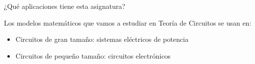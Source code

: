 \documentclass[aspectratio=169, xcolor={usenames,svgnames,dvipsnames}]{beamer}
\begin{document}

\begin{frame}{¿Qué aplicaciones tiene esta asignatura?}

    Los modelos matemáticos que vamos a estudiar en Teoría de Circuitos se usan en:
    
    \begin{itemize}
        \item Circuitos de gran tamaño: \alert{sistemas eléctricos de potencia}
        \item Circuitos de pequeño tamaño: \alert{circuitos electrónicos}        
    \end{itemize}

    \vspace{5mm}


\end{frame}
\end{document}
